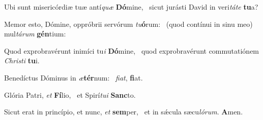 \item Ubi sunt misericórdiæ tuæ antí\textit{quæ} \textbf{Dó}mine,~\psstar{} sicut jurásti David in veri\textit{táte} \textbf{tu}a?
\item Memor esto, Dómine, oppróbrii servórum \textit{tu}\textbf{ó}rum:~\psstar{} (quod contínui in sinu meo) mul\textit{tárum} \textbf{gén}tium:
\item Quod exprobravérunt inimíci tu\textit{i} \textbf{Dó}mine,~\psstar{} quod exprobravérunt commutatiónem \textit{Christi} \textbf{tu}i.
\item Benedíctus Dóminus in \textit{æ}\textbf{tér}num:~\psstar{} \textit{fiat}, \textbf{fi}at.
\item Glória Patri, \textit{et} \textbf{Fí}lio,~\psstar{} et Spirí\textit{tui} \textbf{Sanc}to.
\item Sicut erat in princípio, et nunc, \textit{et} \textbf{sem}per,~\psstar{} et in sǽcula sæcu\textit{lórum}. \textbf{A}men.
